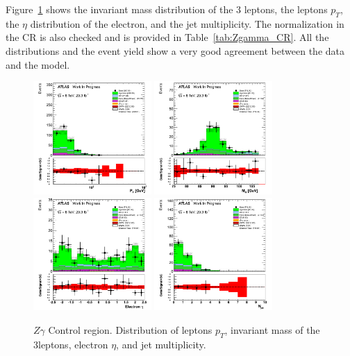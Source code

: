 Figure~\ref{fig:Zgamma_CR} shows the invariant mass distribution of the 3 leptons, the leptons $p_{T}$, the $\eta$ distribution of the electron, and the jet multiplicity. The normalization in the CR is also checked and is provided in Table~\ref{tab:Zgamma_CR}.
All the distributions and the event yield show a very good agreement between the data and the model.

\begin{figure}[htp]
\centering
\includegraphics[width=0.4\textwidth]{figures/ZG_CR/AllLeptonPt_histratio.png}
\includegraphics[width=0.4\textwidth]{figures/ZG_CR/InvariantMassThreeLep_histratio.png}
\includegraphics[width=0.4\textwidth]{figures/ZG_CR/ElectronEta_histratio.png}
\includegraphics[width=0.4\textwidth]{figures/ZG_CR/NJets_histratio.png}

\caption{$Z\gamma$ Control region. Distribution of leptons $p_{T}$, invariant mass of the 3leptons, electron $\eta$, and jet multiplicity.}
\label{fig:Zgamma_CR}
\end{figure}  


